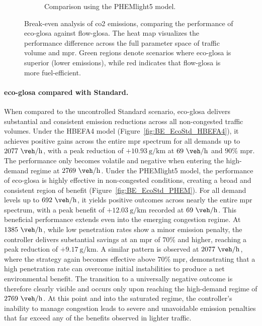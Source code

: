\begin{figure}[htbp]
\begin{subfigure}[b]{0.65\textwidth}
    \caption{Comparison using the PHEMlight5 model.}
    \label{fig:BE_EcoFlow_PHEM}
  \end{subfigure}
  \caption[Break-even CO2 map: Eco-GLOSA vs. Flow-GLOSA]{Break-even analysis of \ac{co2} emissions, comparing the performance of \ac{eco-glosa} against \ac{flow-glosa}. The heat map visualizes the performance difference across the full parameter space of traffic volume and \ac{mpr}. Green regions denote scenarios where \ac{eco-glosa} is superior (lower emissions), while red indicates that \ac{flow-glosa} is more fuel-efficient.}
  \label{fig:BE_EcoFlow}
\end{figure}

\paragraph{\ac{eco-glosa} compared with Standard.}
When compared to the uncontrolled Standard scenario, \ac{eco-glosa} delivers substantial and consistent emission reductions across all non-congested traffic volumes. Under the HBEFA4 model (Figure~\vref{fig:BE_EcoStd_HBEFA4}), it achieves positive gains across the entire \ac{mpr} spectrum for all demands up to $2077~\unit{\veh\per\hour}$, with a peak reduction of $+10.93~\unit{\gram\per\kilo\metre}$ at $69~\unit{\veh\per\hour}$ and $90\%$ \ac{mpr}. The performance only becomes volatile and negative when entering the high-demand regime at $2769~\unit{\veh\per\hour}$.
\mynewline
Under the PHEMlight5 model, the performance of \ac{eco-glosa} is highly effective in non-congested conditions, creating a broad and consistent region of benefit (Figure~\vref{fig:BE_EcoStd_PHEM}). For all demand levels up to $692~\unit{\veh\per\hour}$, it yields positive outcomes across nearly the entire \ac{mpr} spectrum, with a peak benefit of $+12.03~\unit{\gram\per\kilo\metre}$ recorded at $69~\unit{\veh\per\hour}$. This beneficial performance extends even into the emerging congestion regime. At $1385~\unit{\veh\per\hour}$, while low penetration rates show a minor emission penalty, the controller delivers substantial savings at an \ac{mpr} of $70\%$ and higher, reaching a peak reduction of $+9.17~\unit{\gram\per\kilo\metre}$. A similar pattern is observed at $2077~\unit{\veh\per\hour}$, where the strategy again becomes effective above $70\%$ \ac{mpr}, demonstrating that a high penetration rate can overcome initial instabilities to produce a net environmental benefit. The transition to a universally negative outcome is therefore clearly visible and occurs only upon reaching the high-demand regime of $2769~\unit{\veh\per\hour}$. At this point and into the saturated regime, the controller's inability to manage congestion leads to severe and unavoidable emission penalties that far exceed any of the benefits observed in lighter traffic.

